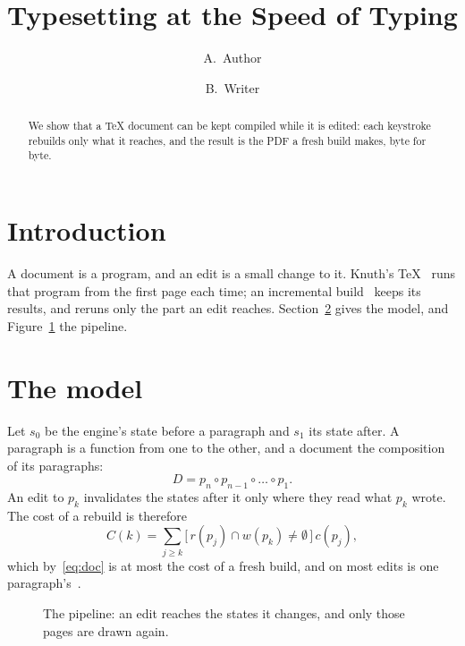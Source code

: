 \documentclass[11pt]{article}
\title{Typesetting at the Speed of Typing}
\author{A.~Author \and B.~Writer}
\date{}
\begin{document}
\maketitle

\begin{abstract}
We show that a TeX document can be kept compiled while it is edited: each
keystroke rebuilds only what it reaches, and the result is the PDF a fresh
build makes, byte for byte.
\end{abstract}

\section{Introduction}\label{sec:intro}

A document is a program, and an edit is a small change to it. Knuth's
\TeX{}~\cite{knuth1984} runs that program from the first page each time;
an incremental build~\cite{acar2005,hammer2014} keeps its results, and
reruns only the part an edit reaches. Section~\ref{sec:model} gives the
model, and Figure~\ref{fig:pipeline} the pipeline.

\section{The model}\label{sec:model}

Let $s_0$ be the engine's state before a paragraph and $s_1$ its state
after. A paragraph is a function from one to the other, and a document
the composition of its paragraphs:
\begin{equation}\label{eq:doc}
  D = p_n \circ p_{n-1} \circ \dots \circ p_1 .
\end{equation}
An edit to $p_k$ invalidates the states after it only where they read
what $p_k$ wrote. The cost of a rebuild is therefore
\begin{equation}\label{eq:cost}
  C(k) = \sum_{j \ge k} \bigl[\, r(p_j) \cap w(p_k) \neq \emptyset \,\bigr]\, c(p_j),
\end{equation}
which by~\eqref{eq:doc} is at most the cost of a fresh build, and on most
edits is one paragraph's~\cite{acar2005}.

\begin{figure}[t]
  \centering
  \caption{The pipeline: an edit reaches the states it changes, and only those pages are drawn again.}
  \label{fig:pipeline}
\end{figure}
\end{document}

